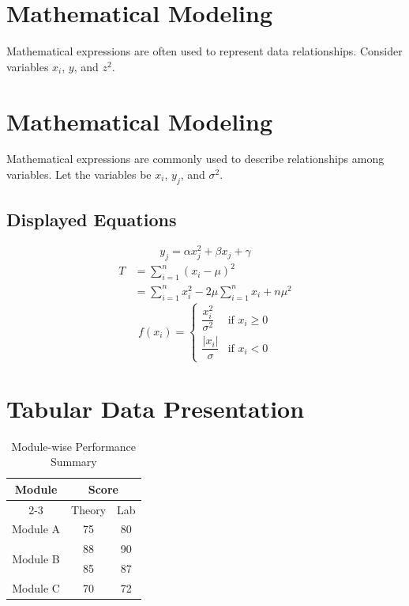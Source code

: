 \documentclass[11pt]{article}
\begin{document}
\section{Mathematical Modeling}
Mathematical expressions are often used to represent data relationships. Consider
variables $x_i$, $y$, and $z^2$.

\section{Mathematical Modeling}
Mathematical expressions are commonly used to describe relationships among
variables. Let the variables be $x_i$, $y_j$, and $\sigma^2$.

\subsection{Displayed Equations}
\begin{equation}
    y_j = \alpha x_j^2 + \beta x_j + \gamma
\end{equation}
\begin{equation}
    \begin{split}
        T &= \sum_{i=1}^{n}(x_i-\mu)^2 \\
          &= \sum_{i=1}^{n} x_i^2 - 2\mu\sum_{i=1}^{n} x_i + n\mu^2
    \end{split}
\end{equation}
\[
    f(x_i) = \begin{cases}
        \dfrac{x_i^2}{\sigma^2} & \text{if } x_i \ge 0 \\[2ex]
        \dfrac{|x_i|}{\sigma}   & \text{if } x_i < 0
    \end{cases}
\]

\section{Tabular Data Presentation}
\begin{table}[ht]
    \centering
    \begin{tabular}{|c|c|c|}
        \hline
        \multirow{2}{*}{\textbf{Module}} & \multicolumn{2}{c|}{\textbf{Score}} \\
        \cline{2-3}
                 & Theory & Lab \\
        \hline
        Module A & 75 & 80 \\
        \hline
        \multirow{2}{*}{Module B} & 88 & 90 \\
                                  & 85 & 87 \\
        \hline
        Module C & 70 & 72 \\
        \hline
    \end{tabular}
    \caption{Module-wise Performance Summary}
    \label{tab:modules}
\end{table}
\end{document}
